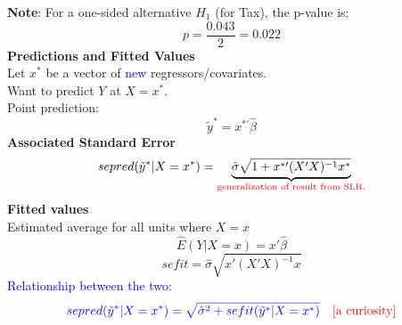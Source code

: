 \documentclass[14pt]{extarticle}
\begin{document}
\noindent
\textbf{Note}: For a one-sided alternative $H_1$ (for Tax), the p-value is:
\[
p = \frac{0.043}{2} = 0.022
\]
\textbf{Predictions and Fitted Values}\\
Let $x^*$ be a vector of \textcolor{blue}{new} regressors/covariates.\\
Want to predict $Y$ at $X = x^*$.\\
Point prediction:
\[
\tilde{y}^* = x^{*\prime} \hat{\beta}
\]
\textbf{Associated Standard Error}
\[
sepred(\tilde{y}^* | X= x^*)
= \underbrace{\hat{\sigma} \sqrt{1 + x^{*\prime} (X'X)^{-1} x^*}}_{\textcolor{red}{\text{generalization of result from SLR.}}}
\]
\textbf{Fitted values}\\
Estimated average for all units where \(X=x\)
\[
\hat{E}(Y|X=x) = x'\hat{\beta}
\]
\[
sefit = \hat{\sigma} \sqrt{x'(X'X)^{-1}x}
\]
\textcolor{blue}{Relationship between the two:}
\[\textcolor{blue}{
sepred(\tilde{y}^* | X = x^*) = \sqrt{\hat{\sigma}^2 + sefit(\tilde{y}^* | X = x^*)}}\textcolor{red}{\quad [\text{a curiosity}]}
\]
\end{document}
